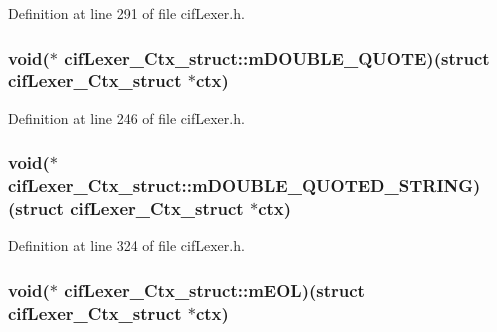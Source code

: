 Definition at line 291 of file cif\-Lexer.\-h.

\hypertarget{structcif_lexer___ctx__struct_aff0fb4d8625a520f42fa5b2eb3f35633}{
\subsubsection[{m\-D\-O\-U\-B\-L\-E\-\_\-\-Q\-U\-O\-T\-E}]{\setlength{\rightskip}{0pt plus 5cm}void($\ast$ cif\-Lexer\-\_\-\-Ctx\-\_\-struct\-::m\-D\-O\-U\-B\-L\-E\-\_\-\-Q\-U\-O\-T\-E)(struct {\bf cif\-Lexer\-\_\-\-Ctx\-\_\-struct} $\ast$ctx)}}\label{structcif_lexer___ctx__struct_aff0fb4d8625a520f42fa5b2eb3f35633}


Definition at line 246 of file cif\-Lexer.\-h.

\hypertarget{structcif_lexer___ctx__struct_abf2086c5abd70faf7d34c10a27981961}{
\subsubsection[{m\-D\-O\-U\-B\-L\-E\-\_\-\-Q\-U\-O\-T\-E\-D\-\_\-\-S\-T\-R\-I\-N\-G}]{\setlength{\rightskip}{0pt plus 5cm}void($\ast$ cif\-Lexer\-\_\-\-Ctx\-\_\-struct\-::m\-D\-O\-U\-B\-L\-E\-\_\-\-Q\-U\-O\-T\-E\-D\-\_\-\-S\-T\-R\-I\-N\-G)(struct {\bf cif\-Lexer\-\_\-\-Ctx\-\_\-struct} $\ast$ctx)}}\label{structcif_lexer___ctx__struct_abf2086c5abd70faf7d34c10a27981961}


Definition at line 324 of file cif\-Lexer.\-h.

\hypertarget{structcif_lexer___ctx__struct_affe6c1b545a5966c8faf47dee31ff7e2}{
\subsubsection[{m\-E\-O\-L}]{\setlength{\rightskip}{0pt plus 5cm}void($\ast$ cif\-Lexer\-\_\-\-Ctx\-\_\-struct\-::m\-E\-O\-L)(struct {\bf cif\-Lexer\-\_\-\-Ctx\-\_\-struct} $\ast$ctx)}}\label{structcif_lexer___ctx__struct_affe6c1b545a5966c8faf47dee31ff7e2}


